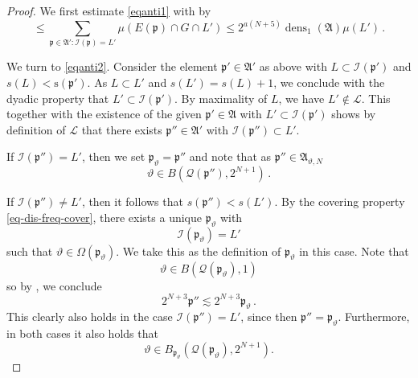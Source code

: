 \documentclass[10pt,a4paper]{article}
\theoremstyle{plain}
\theoremstyle{definition}
\numberwithin{equation}{subsection}
\DeclareMathOperator{\dens}{\operatorname{dens}}
\newcommand{\fp}{{\mathfrak p}}
\newcommand{\ps}{{\mathrm{s}}}
\newcommand{\fc}{{\Omega}}
\newcommand{\scI}{{\mathcal{I}}} %
\newcommand{\mfa}{{\vartheta}}
\newcommand{\fcc}{{\mathcal{Q}}}
\begin{document}
\begin{proof}
We first estimate \eqref{eqanti1}
with  by
\begin{equation}\label{equanti1.5}
    \le \sum_{\fp\in\mathfrak{A}':\scI(\fp)=L'}\mu(E(\fp)\cap G\cap L')\le 2^{a(N+5)}\dens_1(\mathfrak{A})\mu(L')\, .
\end{equation}

We turn to \eqref{eqanti2}.
Consider the element $\fp'\in \mathfrak{A}'$ as above
with $L\subset \scI(\fp')$ and $s(L)<\ps(\fp')$.
As $L\subset L'$ and $s(L')=s(L)+1$, we conclude with the dyadic property that $L'\subset \scI(\fp')$.
By maximality of $L$, we have
$L'\not\in \mathcal{L}$.
This together with the existence of the given $\fp'\in \mathfrak{A}$
with $L'\subset \scI(\fp')$
shows by definition of $\mathcal{L}$ that there exists $\fp''\in \mathfrak{A}'$ with
$\scI(\fp'')\subset L'$.

If $\scI(\fp'') = L'$, then we set $\fp_{\mfa} = \fp''$ and note that as $\fp'' \in \mathfrak{A}_{\mfa,N}$
\begin{equation}
    \mfa \in B(\fcc(\fp''), 2^{N+1})\, .
\end{equation}

If $\scI(\fp'') \ne L'$, then it follows that $s(\fp'') < s(L')$.
By the covering property \eqref{eq-dis-freq-cover}, there exists a unique $\fp_{\mfa}$ with
\begin{equation*}
    \scI(\fp_{\mfa})=L'
\end{equation*}
such that $\mfa\in \fc(\fp_{\mfa})$. We take this as the definition of $\fp_\mfa$ in this case.
Note that
\begin{equation}
    \mfa\in B(\fcc(\fp_{\mfa}), 1)
\end{equation}
so by , we conclude
\begin{equation}
    2^{N+3}\fp'' \lesssim 2^{N+3}\fp_{\mfa} \, .
\end{equation}
This clearly also holds in the case $\scI(\fp'') = L'$, since then $\fp'' = \fp_\mfa$. Furthermore,
in both cases it also holds that
\begin{equation}
    \mfa\in B_{\fp_{\mfa}}(\fcc(\fp_{\mfa}), 2^{N+1}).
\end{equation}


\end{proof}
\end{document}
